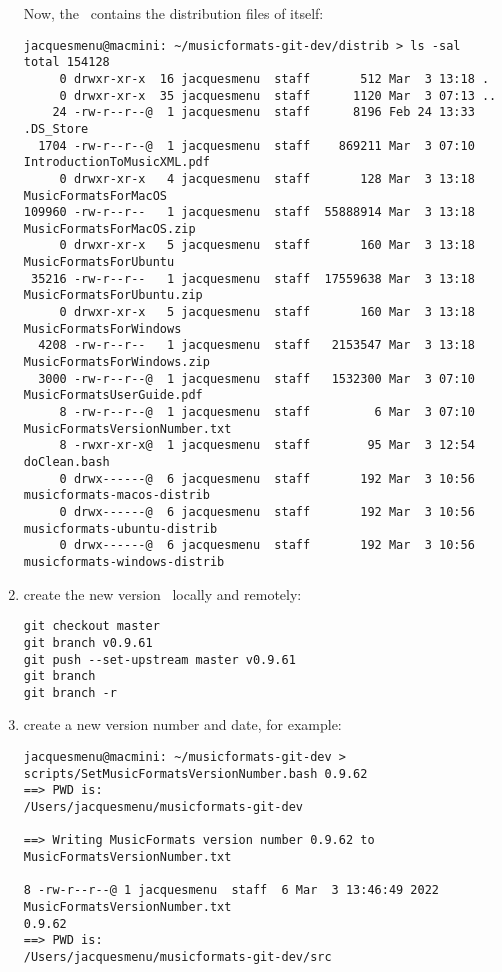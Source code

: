 \begin{enumerate}
Now, the \masterBranch\ contains the distribution files of itself:
\begin{lstlisting}[language=TerminalSmall]
jacquesmenu@macmini: ~/musicformats-git-dev/distrib > ls -sal
total 154128
     0 drwxr-xr-x  16 jacquesmenu  staff       512 Mar  3 13:18 .
     0 drwxr-xr-x  35 jacquesmenu  staff      1120 Mar  3 07:13 ..
    24 -rw-r--r--@  1 jacquesmenu  staff      8196 Feb 24 13:33 .DS_Store
  1704 -rw-r--r--@  1 jacquesmenu  staff    869211 Mar  3 07:10 IntroductionToMusicXML.pdf
     0 drwxr-xr-x   4 jacquesmenu  staff       128 Mar  3 13:18 MusicFormatsForMacOS
109960 -rw-r--r--   1 jacquesmenu  staff  55888914 Mar  3 13:18 MusicFormatsForMacOS.zip
     0 drwxr-xr-x   5 jacquesmenu  staff       160 Mar  3 13:18 MusicFormatsForUbuntu
 35216 -rw-r--r--   1 jacquesmenu  staff  17559638 Mar  3 13:18 MusicFormatsForUbuntu.zip
     0 drwxr-xr-x   5 jacquesmenu  staff       160 Mar  3 13:18 MusicFormatsForWindows
  4208 -rw-r--r--   1 jacquesmenu  staff   2153547 Mar  3 13:18 MusicFormatsForWindows.zip
  3000 -rw-r--r--@  1 jacquesmenu  staff   1532300 Mar  3 07:10 MusicFormatsUserGuide.pdf
     8 -rw-r--r--@  1 jacquesmenu  staff         6 Mar  3 07:10 MusicFormatsVersionNumber.txt
     8 -rwxr-xr-x@  1 jacquesmenu  staff        95 Mar  3 12:54 doClean.bash
     0 drwx------@  6 jacquesmenu  staff       192 Mar  3 10:56 musicformats-macos-distrib
     0 drwx------@  6 jacquesmenu  staff       192 Mar  3 10:56 musicformats-ubuntu-distrib
     0 drwx------@  6 jacquesmenu  staff       192 Mar  3 10:56 musicformats-windows-distrib
\end{lstlisting}

\item create the new version \branch\ locally and remotely:
\begin{lstlisting}[language=TerminalSmall]
git checkout master
git branch v0.9.61
git push --set-upstream master v0.9.61
git branch
git branch -r
\end{lstlisting}

\item create a new version number and date, for example:
\begin{lstlisting}[language=TerminalSmall]
jacquesmenu@macmini: ~/musicformats-git-dev > scripts/SetMusicFormatsVersionNumber.bash 0.9.62
==> PWD is:
/Users/jacquesmenu/musicformats-git-dev

==> Writing MusicFormats version number 0.9.62 to MusicFormatsVersionNumber.txt

8 -rw-r--r--@ 1 jacquesmenu  staff  6 Mar  3 13:46:49 2022 MusicFormatsVersionNumber.txt
0.9.62
==> PWD is:
/Users/jacquesmenu/musicformats-git-dev/src


\end{lstlisting}
\end{enumerate}
